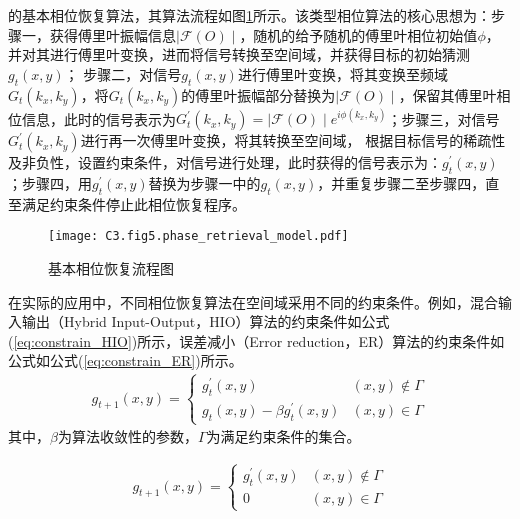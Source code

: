 的基本相位恢复算法，其算法流程如图\ref{fig:3.5}所示。该类型相位算法的核心思想为：步骤一，获得傅里叶振幅信息$\mid \mathcal{F}(O) \mid$，随机的给予随机的傅里叶相位初始值$\phi$，并对其进行傅里叶变换，进而将信号转换至空间域，并获得目标的初始猜测$g_t(x,y)$；
步骤二，对信号$g_t(x,y)$进行傅里叶变换，将其变换至频域$G_t(k_x,k_y)$，将$G_t(k_x,k_y)$的傅里叶振幅部分替换为$\mid \mathcal{F}(O) \mid$，保留其傅里叶相位信息，此时的信号表示为$G^{\prime}_t(k_x,k_y) =\mid \mathcal{F}(O) \mid e^{i\phi (k_x,k_y)}$；步骤三，对信号$G^{\prime}_t(k_x,k_y)$进行再一次傅里叶变换，将其转换至空间域，
根据目标信号的稀疏性及非负性，设置约束条件，对信号进行处理，此时获得的信号表示为：$g^{\prime}_t(x,y)$；步骤四，用$g^{\prime}_t(x,y)$替换为步骤一中的$g_t(x,y)$，并重复步骤二至步骤四，直至满足约束条件停止此相位恢复程序。

\begin{figure}[htp]
	\centering
	\texttt{[image: C3.fig5.phase\_retrieval\_model.pdf]}
	\caption{基本相位恢复流程图}
	\label{fig:3.5}
\end{figure}
在实际的应用中，不同相位恢复算法在空间域采用不同的约束条件。例如，混合输入输出（Hybrid Input-Output，HIO）算法的约束条件如公式(\ref{eq:constrain_HIO})所示，误差减小（Error
reduction，ER）算法的约束条件如公式如公式(\ref{eq:constrain_ER})所示。
\begin{equation}
\begin{aligned}
 g_{t+1}(x,y) =
		  \begin{cases}
		    g_{t}^{\prime}(x,y)   &   (x,y)\notin\Gamma\\
		    g_{t}(x,y)-\beta g_{t}^{\prime}(x,y) & (x,y)\in\Gamma
		  \end{cases}
\end{aligned}
\label{eq:constrain_ER}
\end{equation}
其中，$\beta$为算法收敛性的参数，$\Gamma$为满足约束条件的集合。

\begin{equation}
\begin{aligned}
 g_{t+1}(x,y) =
		  \begin{cases}
		    g_{t}^{\prime}(x,y)   &   (x,y)\notin\Gamma\\
		    0  & (x,y)\in\Gamma
		  \end{cases}
\end{aligned}
\label{eq:constrain_HIO}
\end{equation}

